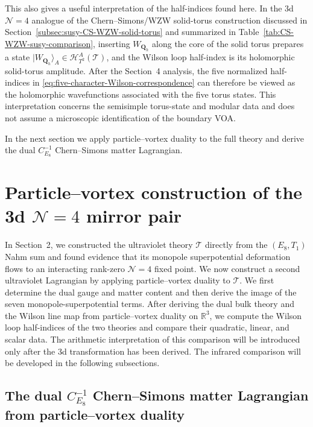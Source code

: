 \documentclass[11pt,a4paper]{article}
\numberwithin{equation}{section}
\begin{document}
This also gives a useful interpretation of the half-indices found here.  In the 3d $\mathcal N=4$ analogue of the Chern--Simons/WZW solid-torus construction discussed in Section~\ref{subsec:susy-CS-WZW-solid-torus} and summarized in Table~\ref{tab:CS-WZW-susy-comparison}, inserting $W_{\boldsymbol Q_h}$ along the core of the solid torus prepares a state $|W_{\boldsymbol Q_h}\rangle_A\in\mathscr H_{T^2}^{A}(\mathcal T)$, and the Wilson loop half-index is its holomorphic solid-torus amplitude.  After the Section~4 analysis, the five normalized half-indices in \eqref{eq:five-character-Wilson-correspondence} can therefore be viewed as the holomorphic wavefunctions associated with the five torus states.  This interpretation concerns the semisimple torus-state and modular data and does not assume a microscopic identification of the boundary VOA.

In the next section we apply particle--vortex duality to the full theory and derive the dual $C_{E_8}^{-1}$ Chern--Simons matter Lagrangian.


\section{Particle--vortex construction of the 3d $\mathcal N=4$ mirror pair}
\label{sec:particle-vortex-mirror}

In Section~2, we constructed the ultraviolet theory $\mathcal T$ directly from the $(E_8,T_1)$ Nahm sum and found evidence that its monopole superpotential deformation flows to an interacting rank-zero $\mathcal N=4$ fixed point.  We now construct a second ultraviolet Lagrangian by applying particle--vortex duality to $\mathcal T$.  We first determine the dual gauge and matter content and then derive the image of the seven monopole-superpotential terms.  After deriving the dual bulk theory and the Wilson line map from particle--vortex duality on $\mathbb R^3$, we compute the Wilson loop half-indices of the two theories and compare their quadratic, linear, and scalar data.  The arithmetic interpretation of this comparison will be introduced only after the 3d transformation has been derived.  The infrared comparison will be developed in the following subsections.

\subsection{The dual $C_{E_8}^{-1}$ Chern--Simons matter Lagrangian from particle--vortex duality}
\label{subsec:dual-Lagrangian-PV}
\end{document}
